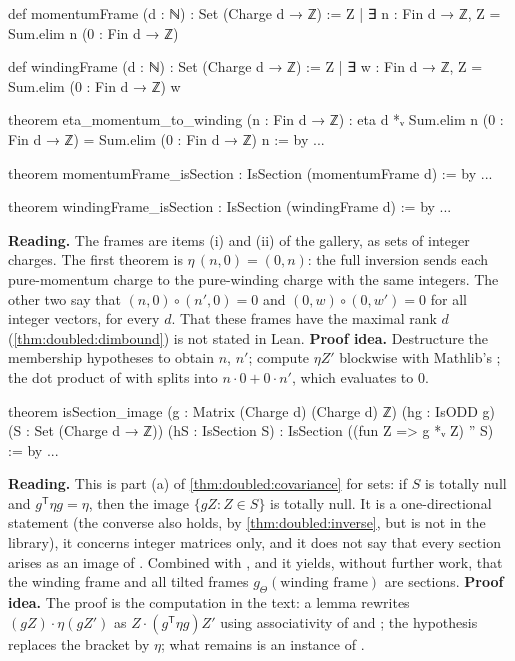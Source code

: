 \begin{leanbox}
\begin{leancode}
def momentumFrame (d : ℕ) : Set (Charge d → ℤ) :=
  {Z | ∃ n : Fin d → ℤ, Z = Sum.elim n (0 : Fin d → ℤ)}

def windingFrame (d : ℕ) : Set (Charge d → ℤ) :=
  {Z | ∃ w : Fin d → ℤ, Z = Sum.elim (0 : Fin d → ℤ) w}

theorem eta_momentum_to_winding (n : Fin d → ℤ) :
    eta d *ᵥ Sum.elim n (0 : Fin d → ℤ) = Sum.elim (0 : Fin d → ℤ) n := by ...

theorem momentumFrame_isSection : IsSection (momentumFrame d) := by ...

theorem windingFrame_isSection : IsSection (windingFrame d) := by ...
\end{leancode}
\textbf{Reading.} The frames are items (i) and (ii) of the gallery, as sets of integer charges.
The first theorem is $\eta\,(n,0)=(0,n)$: the full inversion sends each pure-momentum charge to
the pure-winding charge with the same integers. The other two say that $(n,0)\circ(n',0)=0$ and
$(0,w)\circ(0,w')=0$ for all integer vectors, for every $d$. That these frames have the maximal
rank $d$ (\cref{thm:doubled:dimbound}) is not stated in Lean. \textbf{Proof idea.} Destructure
the membership hypotheses to obtain $n$, $n'$; compute $\eta Z'$ blockwise with Mathlib's
; the dot product of  with 
splits into $n\cdot0+0\cdot n'$, which  evaluates to $0$.
\end{leanbox}

\begin{leanbox}
\begin{leancode}
theorem isSection_image (g : Matrix (Charge d) (Charge d) ℤ) (hg : IsODD g)
    (S : Set (Charge d → ℤ)) (hS : IsSection S) :
    IsSection ((fun Z => g *ᵥ Z) '' S) := by ...
\end{leancode}
\textbf{Reading.} This is part (a) of \cref{thm:doubled:covariance} for sets: if $S$ is totally
null and $g^{\mathsf T}\eta g=\eta$, then the image $\{gZ:Z\in S\}$ is totally null. It is a
one-directional statement (the converse also holds, by \cref{thm:doubled:inverse}, but is not in
the library), it concerns integer matrices only, and it does not say that every section arises
as an image of . Combined with , 
and  it yields, without further work, that the winding frame
and all tilted frames $g_\Theta(\text{winding frame})$ are sections. \textbf{Proof idea.} The
proof is the computation in the text: a lemma  rewrites
$(gZ)\cdot\eta(gZ')$ as $Z\cdot(g^{\mathsf T}\eta g)Z'$ using associativity of  and
; the hypothesis  replaces the bracket by $\eta$; what remains
is an instance of .
\end{leanbox}

